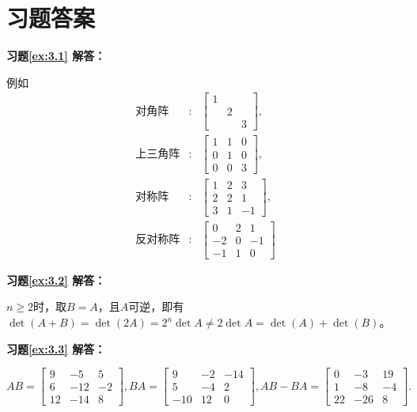 \documentclass[a4paper]{book}
\begin{document}

\section{习题答案}

\textbf{习题\ref{ex:3.1} 解答：}

例如
\begin{eqnarray*}
\text{对角阵} & : & \begin{bmatrix} 1 & & \\ & 2 & \\ & & 3 \end{bmatrix}, \\
\text{上三角阵} & : & \begin{bmatrix} 1 & 1 & 0 \\ 0 & 1 & 0 \\ 0 & 0 & 3 \end{bmatrix}, \\
\text{对称阵} & : & \begin{bmatrix} 1 & 2 & 3\\ 2 & 2 & 1 \\ 3 & 1 & -1 \end{bmatrix}, \\
\text{反对称阵} & : & \begin{bmatrix} 0 & 2 & 1\\ -2 & 0 & -1 \\ -1 & 1 & 0 \end{bmatrix}
\end{eqnarray*}

\vspace{1.5em}

\textbf{习题\ref{ex:3.2} 解答：}

$n \geqslant 2$时，取$B = A$，且$A$可逆，即有$\det(A+B) = \det(2A) = 2^n\det A \neq 2\det A = \det(A)+\det(B)$。

\vspace{1.5em}

\textbf{习题\ref{ex:3.3} 解答：}

$
AB = \begin{bmatrix} 9 & -5 & 5 \\ 6 & -12 & -2 \\ 12 & -14 & 8 \end{bmatrix},
BA = \begin{bmatrix} 9 & -2 & -14 \\ 5 & -4 & 2 \\ -10 & 12 & 0 \end{bmatrix},
AB - BA = \begin{bmatrix} 0 & -3 & 19 \\  1 & -8 & -4 \\ 22 & -26 & 8 \end{bmatrix}.
$
\end{document}
